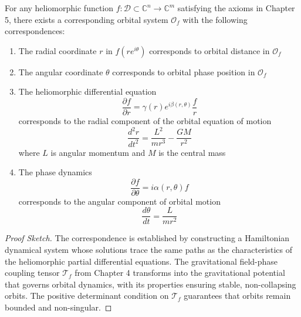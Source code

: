 \begin{theorem}
For any heliomorphic function $f: \mathcal{D} \subset \mathbb{C}^n \rightarrow \mathbb{C}^m$ satisfying the axioms in Chapter 5, there exists a corresponding orbital system $\mathcal{O}_f$ with the following correspondences:

\begin{enumerate}
    \item The radial coordinate $r$ in $f(re^{i\theta})$ corresponds to orbital distance in $\mathcal{O}_f$
    
    \item The angular coordinate $\theta$ corresponds to orbital phase position in $\mathcal{O}_f$
    
    \item The heliomorphic differential equation
    \begin{equation}
    \frac{\partial f}{\partial r} = \gamma(r)e^{i\beta(r,\theta)}\frac{f}{r}
    \end{equation}
    corresponds to the radial component of the orbital equation of motion
    \begin{equation}
    \frac{d^2r}{dt^2} = \frac{L^2}{mr^3} - \frac{GM}{r^2}
    \end{equation}
    where $L$ is angular momentum and $M$ is the central mass
    
    \item The phase dynamics
    \begin{equation}
    \frac{\partial f}{\partial \theta} = i\alpha(r,\theta)f
    \end{equation}
    corresponds to the angular component of orbital motion
    \begin{equation}
    \frac{d\theta}{dt} = \frac{L}{mr^2}
    \end{equation}
\end{enumerate}
\end{theorem}

\begin{proof}[Proof Sketch]
The correspondence is established by constructing a Hamiltonian dynamical system whose solutions trace the same paths as the characteristics of the heliomorphic partial differential equations. The gravitational field-phase coupling tensor $\mathcal{T}_f$ from Chapter 4 transforms into the gravitational potential that governs orbital dynamics, with its properties ensuring stable, non-collapsing orbits. The positive determinant condition on $\mathcal{T}_f$ guarantees that orbits remain bounded and non-singular.
\end{proof}

